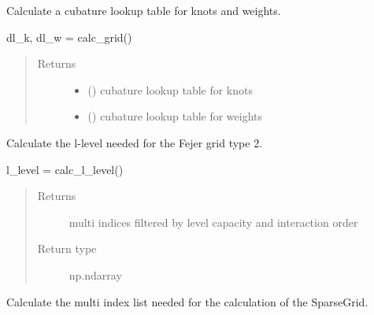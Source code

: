 \documentclass[letterpaper,10pt,english,openany,oneside]{sphinxmanual}
\begin{document}
\begin{fulllineitems}
\begin{fulllineitems}
\label{\detokenize{pygpc:pygpc.grid.SparseGrid.calc_grid}}
Calculate a cubature lookup table for knots and weights.

dl\_k, dl\_w = calc\_grid()
\begin{quote}\begin{description}
\item[{Returns}] \leavevmode
\begin{itemize}
\item {} 
 () \textendash{} cubature lookup table for knots

\item {} 
 () \textendash{} cubature lookup table for weights

\end{itemize}


\end{description}\end{quote}

\end{fulllineitems}


\begin{fulllineitems}
\label{\detokenize{pygpc:pygpc.grid.SparseGrid.calc_l_level}}
Calculate the l-level needed for the Fejer grid type 2.

l\_level = calc\_l\_level()
\begin{quote}\begin{description}
\item[{Returns}] \leavevmode
{} \textendash{} multi indices filtered by level capacity and interaction order

\item[{Return type}] \leavevmode
np.ndarray

\end{description}\end{quote}

\end{fulllineitems}


\begin{fulllineitems}
\label{\detokenize{pygpc:pygpc.grid.SparseGrid.calc_multi_indices}}
Calculate the multi index list needed for the calculation of the SparseGrid.


\end{fulllineitems}
\end{fulllineitems}
\end{document}
